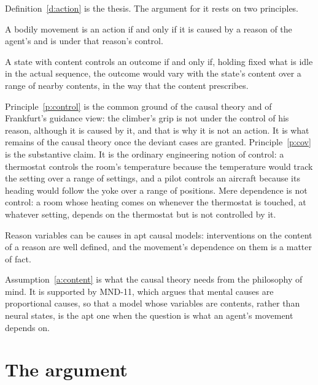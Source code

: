 \documentclass{situationist-preprint}
\begin{document}
Definition~\ref{d:action} is the thesis. The argument for it rests on two principles.

\begin{principle}[Control]\label{p:control}
A bodily movement is an action if and only if it is caused by a reason of the agent's and is under that reason's control.
\end{principle}

\begin{principle}\label{p:cov}
A state with content controls an outcome if and only if, holding fixed what is idle in the actual sequence, the outcome would vary with the state's content over a range of nearby contents, in the way that the content prescribes.
\end{principle}

Principle~\ref{p:control} is the common ground of the causal theory and of Frankfurt's guidance view: the climber's grip is not under the control of his reason, although it is caused by it, and that is why it is not an action. It is what remains of the causal theory once the deviant cases are granted. Principle~\ref{p:cov} is the substantive claim. It is the ordinary engineering notion of control: a thermostat controls the room's temperature because the temperature would track the setting over a range of settings, and a pilot controls an aircraft because its heading would follow the yoke over a range of positions. Mere dependence is not control: a room whose heating comes on whenever the thermostat is touched, at whatever setting, depends on the thermostat but is not controlled by it.

\begin{assumption}\label{a:content}
Reason variables can be causes in apt causal models: interventions on the content of a reason are well defined, and the movement's dependence on them is a matter of fact.
\end{assumption}

Assumption~\ref{a:content} is what the causal theory needs from the philosophy of mind. It is supported by MND-11, which argues that mental causes are proportional causes, so that a model whose variables are contents, rather than neural states, is the apt one when the question is what an agent's movement depends on.

\section{The argument}\label{s:argument}
\end{document}
